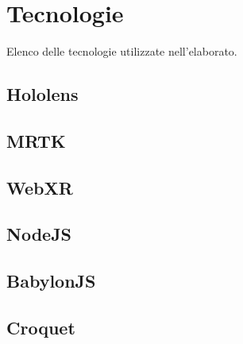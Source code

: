 \chapter{Tecnologie}\label{chap:Tecnologie}
Elenco delle tecnologie utilizzate nell'elaborato.
\section{Hololens}\label{sec:Hololens}
\section{MRTK}\label{sec:MRTK}
\section{WebXR}\label{sec:WebXR}
\section{NodeJS}\label{sec:NodeJS}
\section{BabylonJS}\label{sec:BabylonJS}
\section{Croquet}\label{sec:Croquet}
